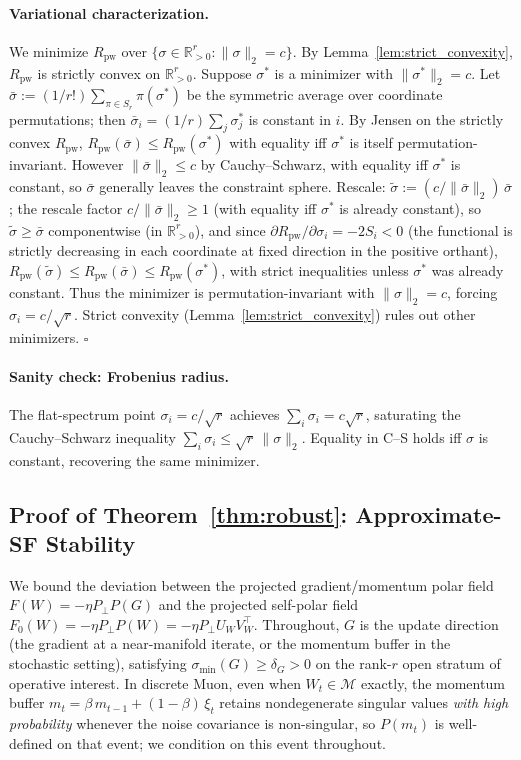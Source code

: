 \documentclass{article}
\begin{document}
\paragraph{Variational characterization.}
We minimize $R_{\mathrm{pw}}$ over $\{\sigma\in\mathbb R^r_{>0}:\|\sigma\|_2=c\}$. By Lemma~\ref{lem:strict_convexity}, $R_{\mathrm{pw}}$ is strictly convex on $\mathbb R^r_{>0}$. Suppose $\sigma^*$ is a minimizer with $\|\sigma^*\|_2=c$. Let $\bar\sigma := (1/r!)\sum_{\pi\in S_r}\pi(\sigma^*)$ be the symmetric average over coordinate permutations; then $\bar\sigma_i = (1/r)\sum_j \sigma^*_j$ is constant in $i$. By Jensen on the strictly convex $R_{\mathrm{pw}}$, $R_{\mathrm{pw}}(\bar\sigma)\leq R_{\mathrm{pw}}(\sigma^*)$ with equality iff $\sigma^*$ is itself permutation-invariant. However $\|\bar\sigma\|_2\leq c$ by Cauchy--Schwarz, with equality iff $\sigma^*$ is constant, so $\bar\sigma$ generally leaves the constraint sphere. Rescale: $\widetilde\sigma := (c/\|\bar\sigma\|_2)\,\bar\sigma$; the rescale factor $c/\|\bar\sigma\|_2 \geq 1$ (with equality iff $\sigma^*$ is already constant), so $\widetilde\sigma \geq \bar\sigma$ componentwise (in $\mathbb R^r_{>0}$), and since $\partial R_{\mathrm{pw}}/\partial\sigma_i = -2 S_i < 0$ (the functional is strictly decreasing in each coordinate at fixed direction in the positive orthant), $R_{\mathrm{pw}}(\widetilde\sigma)\leq R_{\mathrm{pw}}(\bar\sigma)\leq R_{\mathrm{pw}}(\sigma^*)$, with strict inequalities unless $\sigma^*$ was already constant. Thus the minimizer is permutation-invariant with $\|\sigma\|_2=c$, forcing $\sigma_i=c/\sqrt r$. Strict convexity (Lemma~\ref{lem:strict_convexity}) rules out other minimizers. \hfill$\square$

\paragraph{Sanity check: Frobenius radius.}
The flat-spectrum point $\sigma_i = c/\sqrt r$ achieves $\sum_i\sigma_i = c\sqrt r$, saturating the Cauchy--Schwarz inequality $\sum_i\sigma_i \leq \sqrt r\,\|\sigma\|_2$. Equality in C--S holds iff $\sigma$ is constant, recovering the same minimizer.

\subsection{Proof of Theorem~\ref{thm:robust}: Approximate-\textsf{SF} Stability}
\label{app:proof_robust}

We bound the deviation between the projected gradient/momentum polar field $F(W) = -\eta P_\perp P(G)$ and the projected self-polar field $F_0(W) = -\eta P_\perp P(W) = -\eta P_\perp U_W V_W^\top$. Throughout, $G$ is the update direction (the gradient at a near-manifold iterate, or the momentum buffer in the stochastic setting), satisfying $\sigma_{\min}(G)\geq\delta_G>0$ on the rank-$r$ open stratum of operative interest. In discrete Muon, even when $W_t\in\mathcal M$ exactly, the momentum buffer $m_t = \beta\,m_{t-1}+(1-\beta)\,\xi_t$ retains nondegenerate singular values \emph{with high probability} whenever the noise covariance is non-singular, so $P(m_t)$ is well-defined on that event; we condition on this event throughout.
\end{document}
